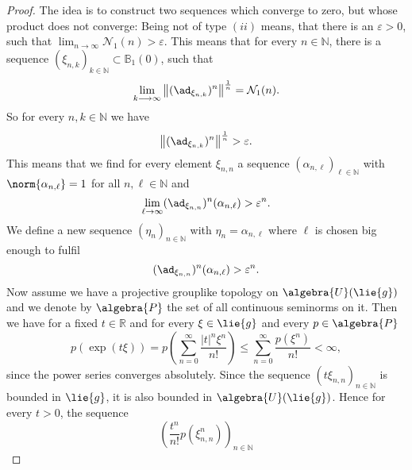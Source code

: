 \documentclass[
11pt,                          %
english                        %
]{article}
\begin{document}
\begin{proof}
	The idea is to construct two sequences which converge to zero, but whose 
	product does not converge: Being not of type $(ii)$ means, that there is an
	$\varepsilon > 0$, such that $\lim_{n \rightarrow \infty} \mathcal{N}_1(n) > 
	\varepsilon$. This means that for every $n \in \mathbb{N}$, there is a sequence 
	$\left(\xi_{n, k} \right)_{k \in \mathbb{N}} \subset \mathbb{B}_1(0)$, 
	such that
	\begin{equation*}
		\lim_{k \longrightarrow \infty}
		\left\Vert
			(\ad_{\xi_{n, k}})^n
		\right\Vert^{\frac{1}{n}}
		=
		\mathcal{N}_1(n).
	\end{equation*}
	So for every $n, k \in \mathbb{N}$ we have
	\begin{equation*}
		\left\Vert
			(\ad_{\xi_{n, k}})^n
		\right\Vert^{\frac{1}{n}}
		> \varepsilon.
	\end{equation*}
	This means that we find for every element $\xi_{n,n}$ a sequence 
	$(\alpha_{n, \ell})_{\ell \in \mathbb{N}}$ with $\norm{\alpha_{n, \ell}} = 1$ 
	for all $n, \ell \in \mathbb{N}$ and
	\begin{equation*}
		\lim_{\ell \rightarrow \infty}
		(\ad_{\xi_{n,n}})^n(\alpha_{n,\ell})
		> 
		\varepsilon^n.
	\end{equation*}
	We define a new sequence $(\eta_n)_{n \in \mathbb{N}}$ with 
	$\eta_n = \alpha_{n, \ell}$ where $\ell$ is chosen big enough to 
	fulfil 
	\begin{equation*}
		(\ad_{\xi_{n,n}})^n(\alpha_{n,\ell}) 
		>
		\varepsilon^n.
	\end{equation*}
	Now assume we have a projective grouplike topology on $\algebra{U}(\lie{g})$ 
	and we denote by $\algebra{P}$ the set of all continuous seminorms on it. 
	Then we have for a fixed $t \in \mathbb{R}$ and for every $\xi \in \lie{g}$ 
	and every $p \in \algebra{P}$
	\begin{equation*}
		p \left( \exp(t \xi) \right)
		=
		p \left(
			\sum\limits_{n=0}^\infty
			\frac{|t|^n \xi^n}{n!}
		\right)
		\leq
		\sum\limits_{n=0}^\infty
		\frac{p\left( \xi^n \right)}{n!}
		<
		\infty,
	\end{equation*}
	since the power series converges absolutely. Since the sequence 
	$(t \xi_{n,n})_{n \in \mathbb{N}}$ is bounded in $\lie{g}$, it is also bounded 
	in $\algebra{U}(\lie{g})$. Hence for every $t > 0$, the sequence
	\begin{equation*}
		\left(
			\frac{t^n}{n!}
			p\left(
				\xi_{n,n}^n
			\right)
		\right)_{n \in \mathbb{N}}
	\end{equation*}

\end{proof}
\end{document}
